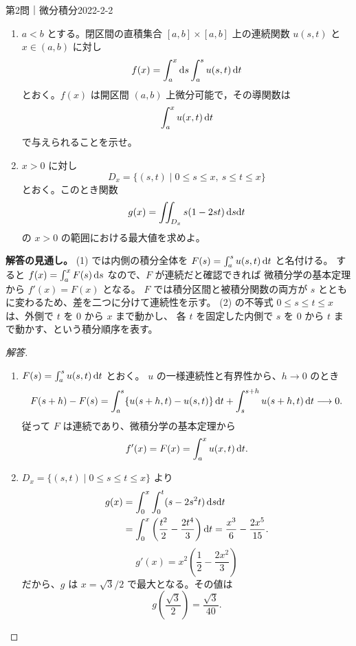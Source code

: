 \begin{problem}{第2問｜微分積分}{2022-2-2}
\begin{enumerate}
  \item[(1)] $a<b$ とする。閉区間の直積集合 $[a,b]\times[a,b]$ 上の連続関数 $u(s,t)$ と $x\in(a,b)$ に対し
  \[
  f(x)=\int_a^x\mathrm{d} s\int_a^su(s,t)\,\mathrm{d} t
  \]
  とおく。$f(x)$ は開区間 $(a,b)$ 上微分可能で，その導関数は
  \[
  \int_a^xu(x,t)\,\mathrm{d} t
  \]
  で与えられることを示せ。
  \item[(2)] $x>0$ に対し
  \[
  D_x=\{(s,t)\mid0\le s\le x,\ s\le t\le x\}
  \]
  とおく。このとき関数
  \[
  g(x)=\iint_{D_x}s(1-2st)\,\mathrm{d} s\mathrm{d} t
  \]
  の $x>0$ の範囲における最大値を求めよ。
\end{enumerate}
\end{problem}
\begin{memo*}
\textbf{解答の見通し。}
(1) では内側の積分全体を $F(s)=\int_a^s u(s,t)\,\mathrm{d} t$ と名付ける。
すると $f(x)=\int_a^xF(s)\,\mathrm{d} s$ なので、$F$ が連続だと確認できれば
微積分学の基本定理から $f'(x)=F(x)$ となる。
$F$ では積分区間と被積分関数の両方が $s$ とともに変わるため、差を二つに分けて連続性を示す。
(2) の不等式 $0\le s\le t\le x$ は、外側で $t$ を $0$ から $x$ まで動かし、
各 $t$ を固定した内側で $s$ を $0$ から $t$ まで動かす、という積分順序を表す。
\end{memo*}
\begin{proof}[解答]
\begin{enumerate}
  \item[(1)] $F(s)=\int_a^s u(s,t)\,\mathrm{d} t$ とおく。
  $u$ の一様連続性と有界性から、$h\to0$ のとき
  \[
  F(s+h)-F(s)
  =\int_a^s\{u(s+h,t)-u(s,t)\}\,\mathrm{d} t
   +\int_s^{s+h}u(s+h,t)\,\mathrm{d} t\longrightarrow0.
  \]
  従って $F$ は連続であり、微積分学の基本定理から
  \[
  f'(x)=F(x)=\int_a^x u(x,t)\,\mathrm{d} t.
  \]

  \item[(2)] $D_x=\{(s,t)\mid0\le s\le t\le x\}$ より
  \begin{align*}
  g(x)
  &=\int_0^x\int_0^t(s-2s^2t)\,\mathrm{d} s\mathrm{d} t\\
  &=\int_0^x\left(\frac{t^2}{2}-\frac{2t^4}{3}\right)\mathrm{d} t
  =\frac{x^3}{6}-\frac{2x^5}{15}.
  \end{align*}
  \[
  g'(x)=x^2\left(\frac12-\frac{2x^2}{3}\right)
  \]
  だから、$g$ は $x=\sqrt3/2$ で最大となる。その値は
  \[
  g\left(\frac{\sqrt3}{2}\right)=\frac{\sqrt3}{40}.
  \]
\end{enumerate}
\end{proof}

